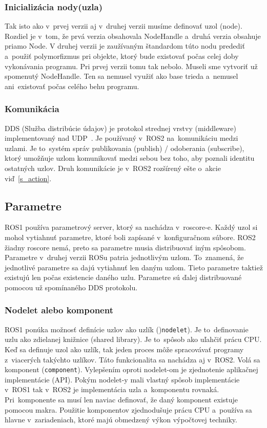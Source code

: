 \subsubsection{Inicializácia nody(uzla)}

	Tak isto ako v~prvej verzii aj v~druhej verzii musíme definovať uzol (node). Rozdiel je v~tom, že prvá verzia obsahovala NodeHandle a~druhá
	verzia obsahuje priamo Node. V druhej verzii je zaužívaným štandardom túto nodu predediť a~použiť polymorfizmus pri objekte, ktorý bude
	existovať počas celej doby vykonávania programu. Pri prvej verzii tomu tak nebolo. Museli sme vytvoriť už spomenutý NodeHandle. Ten sa nemusel
	využiť ako base trieda a~nemusel ani~existovať počas celého behu programu.

\subsubsection{Komunikácia}

	DDS (Služba distribúcie údajov) je protokol strednej vrstvy (middleware) implementovaný nad UDP~\cite{ROS2book}. Je používaný v~ROS2
	na~komunikáciu medzi uzlami. Je to~systém správ publikovania (publish) / odoberania (subscribe), ktorý umožňuje uzlom komunikovať medzi
	sebou bez toho, aby poznali identitu ostatných uzlov. Druh komunikácie je v~ROS2 rozšírený ešte o~akcie viď~\ref{s_action}.

\subsection{Parametre}

	ROS1 používa parametrový server, ktorý sa nachádza v~roscore-e. Každý uzol si mohol vytiahnuť parametre, ktoré boli zapísané v~konfiguračnom
	súbore. ROS2 žiadny roscore nemá, preto sa parametre musia distribuovať iným spôsobom. Parametre v~druhej verzii ROSu patria jednotlivým uzlom.
	To~znamená, že jednotlivé parametre sa dajú vytiahnuť len daným uzlom. Tieto parametre taktiež existujú len počas existencie daného uzlu. Parametre
	sú ďalej distribuované pomocou už spomínaného DDS protokolu.

\subsubsection{Nodelet alebo komponent}

	ROS1 ponúka možnosť definície uzlov ako uzlík ()\texttt{nodelet}). Je to~definovanie uzlu ako zdielanej knižnice (shared library). Je
	to~spôsob ako uľahčiť prácu CPU. Keď sa definuje uzol ako uzlík, tak jeden proces môže spracovávať programy z~viacerých takýchto uzlíkov.
	Táto funkcionalita sa nachádza aj v~ROS2. Volá sa komponent (\texttt{component}). Vylepšením oproti nodelet-om je zjednotenie aplikačnej
	implementácie (API). Pokým nodelet-y mali vlastný spôsob implementácie v~ROS1 tak v~ROS2 je implementácia uzla a~komponentu rovnaká.
	Pri~komponente sa musí len naviac definovať, že daný komponent existuje pomocou makra. Použitie komponentov zjednodušuje prácu CPU
	a~používa sa hlavne v~zariadeniach, ktoré majú obmedzený výkon výpočtovej techniky.

